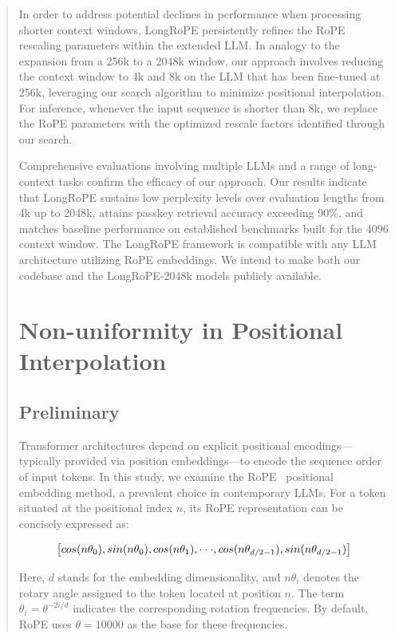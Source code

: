 \begin{abstract}
In order to address potential declines in performance when processing shorter context windows, {LongRoPE} persistently refines the RoPE rescaling parameters within the extended LLM. In analogy to the expansion from a 256k to a 2048k window, our approach involves reducing the context window to 4k and 8k on the LLM that has been fine-tuned at 256k, leveraging our search algorithm to minimize positional interpolation. For inference, whenever the input sequence is shorter than 8k, we replace the RoPE parameters with the optimized rescale factors identified through our search.

Comprehensive evaluations involving multiple LLMs and a range of long-context tasks confirm the efficacy of our approach. Our results indicate that LongRoPE sustains low perplexity levels over evaluation lengths from 4k up to 2048k, attains passkey retrieval accuracy exceeding 90\%, and matches baseline performance on established benchmarks built for the 4096 context window. The LongRoPE framework is compatible with any LLM architecture utilizing RoPE embeddings. We intend to make both our codebase and the LongRoPE-2048k models publicly available.

\section{Non-uniformity in Positional Interpolation}
\label{sec:analysis}

\subsection{Preliminary}

Transformer architectures depend on explicit positional encodings—typically provided via position embeddings—to encode the sequence order of input tokens. In this study, we examine the RoPE~\cite{rope} positional embedding method, a prevalent choice in contemporary LLMs. For a token situated at the positional index $n$, its RoPE representation can be concisely expressed as:

\begin{equation}
		\fontsize{7.8}{7.8} \selectfont
	\label{eq:rope}
	\left[ cos(n\theta_0), sin(n\theta_0), cos(n\theta_1), \cdot\cdot\cdot, cos(n\theta_{d/2-1}), sin(n\theta_{d/2-1}) \right]   
\end{equation}

Here, $d$ stands for the embedding dimensionality, and $n\theta_i$ denotes the rotary angle assigned to the token located at position $n$. The term $\theta_i=\theta^{-2i/d}$ indicates the corresponding rotation frequencies. By default, RoPE uses $\theta=10000$ as the base for these frequencies.


\end{abstract}
